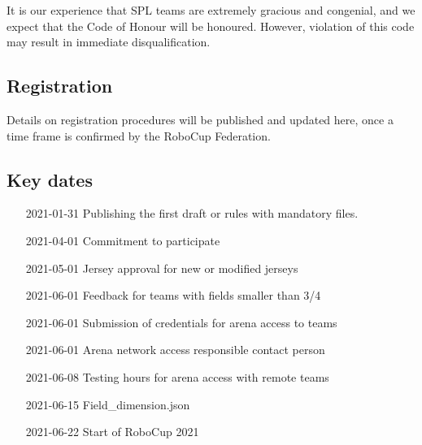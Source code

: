 It is our experience that SPL teams are extremely gracious and congenial, and we expect that the Code of Honour will be honoured. However, violation of this code may result in immediate disqualification.

\subsection{Registration}

Details on registration procedures will be published and updated here, once a time frame is confirmed by the RoboCup Federation.

\subsection{Key dates}

\begin{itemize}[leftmargin=*,labelsep=0.7cm, labelindent=2cm]
    \item [2021-01-31] Publishing the first draft or rules with mandatory files.
    \item [2021-04-01] Commitment to participate
    \item [2021-05-01] Jersey approval for new or modified jerseys
    \item [2021-06-01] Feedback for teams with fields smaller than 3/4
    \item [2021-06-01] Submission of credentials for arena access to teams
    \item [2021-06-01] Arena network access responsible contact person
    \item [2021-06-08] Testing hours for arena access with remote teams
    \item [2021-06-15] Field\_dimension.json
    \item [2021-06-22] Start of RoboCup 2021
\end{itemize}
